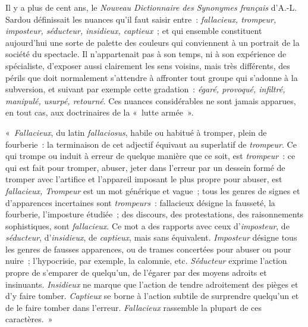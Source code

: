 \documentclass[french,twoside]{book} %
\def\bignobreak{\ifdim\lastskip<\bigskipamount
  \removelastskip\nopagebreak\bigskip\fi}
\newcommand{\labelblock}[1]{\bigbreak{\color{rubric}\noindent\textbf{#1}\par}\bignobreak}
\begin{document}
\labelblock{XV}

\noindent Il y a plus de cent ans, le \emph{Nouveau Dictionnaire des Synonymes français} d’A.-L. Sardou définissait les nuances qu’il faut saisir entre : \emph{fallacieux, trompeur, imposteur, séducteur, insidieux, captieux} ; et qui ensemble constituent aujourd’hui une sorte de palette des couleurs qui conviennent à un portrait de la société du spectacle. Il n’appartenait pas à son temps, ni à son expérience de spécialiste, d’exposer aussi clairement les sens voisins, mais très différents, des périls que doit normalement s’attendre à affronter tout groupe qui s’adonne à la subversion, et suivant par exemple cette gradation : \emph{égaré, provoqué, infiltré, manipulé, usurpé, retourné}. Ces nuances considérables ne sont jamais apparues, en tout cas, aux doctrinaires de la « lutte armée ».\par
« \emph{Fallacieux}, du latin \emph{fallaciosus}, habile ou habitué à tromper, plein de fourberie : la terminaison de cet adjectif équivaut au superlatif de \emph{trompeur}. Ce qui trompe ou induit à erreur de quelque manière que ce soit, est \emph{trompeur} : ce qui est fait pour tromper, abuser, jeter dans l’erreur par un dessein formé de tromper avec l’artifice et l’appareil imposant le plus propre pour abuser, est \emph{fallacieux, Trompeur} est un mot générique et vague ; tous les genres de signes et d’apparences incertaines sont \emph{trompeurs} : fallacieux désigne la fausseté, la fourberie, l’imposture étudiée ; des discours, des protestations, des raisonnements sophistiques, sont \emph{fallacieux}. Ce mot a des rapports avec ceux d’\emph{imposteur}, de \emph{séducteur}, d’\emph{insidieux}, de \emph{captieux}, mais sans équivalent. \emph{Imposteur} désigne tous les genres de fausses apparences, ou de trames concertées pour abuser ou pour nuire ; l’hypocrisie, par exemple, la calomnie, etc. \emph{Séducteur} exprime l’action propre de s’emparer de quelqu’un, de l’égarer par des moyens adroits et insinuants. \emph{Insidieux} ne marque que l’action de tendre adroitement des pièges et d’y faire tomber. \emph{Captieux} se borne à l’action subtile de surprendre quelqu’un et de le faire tomber dans l’erreur. \emph{Fallacieux} rassemble la plupart de ces caractères. »\par

\labelblock{XVI}
\end{document}
